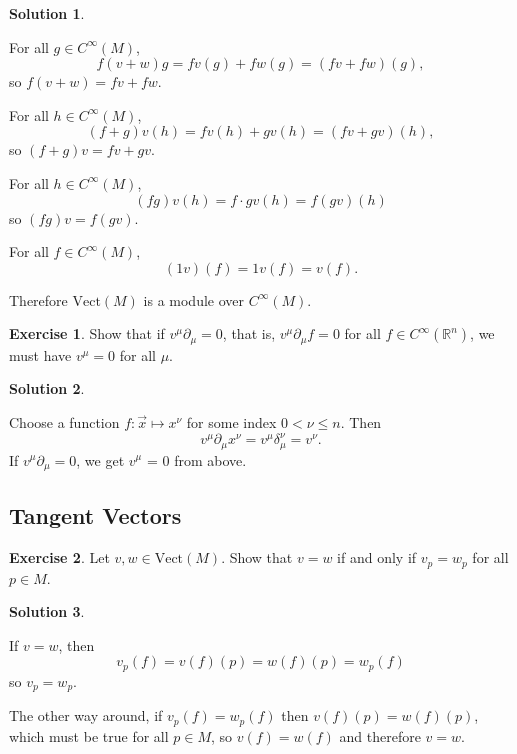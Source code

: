 \documentclass[11pt, a4paper]{article}
\theoremstyle{definition}
\newtheorem{ex}{Exercise}[part]
\newtheorem{sol}{Solution}[part]
\begin{document}
\begin{sol}\label{sol:module}

For all $g \in C^\infty(M)$,
\[
    f(v + w)g = fv(g) + fw(g) = (fv + fw)(g),
\]
so $f(v + w) = fv + fw$.

For all $h \in C^\infty(M)$,
\[
    (f + g)v(h) = fv(h) + gv(h) = (fv + gv)(h),
\]
so $(f + g)v = fv + gv$.


For all $h \in C^\infty(M)$,
\[
    (fg)v(h) = f \cdot gv(h) = f(gv)(h)
\]
so $(fg)v = f(gv)$.

For all $f \in C^\infty(M)$,
\[
    (1v)(f) = 1v(f) = v(f).
\]

Therefore $\text{Vect}(M)$ is a module over $C^\infty(M)$.

\end{sol}

\begin{ex}

Show that if $v^\mu\partial_\mu = 0$, that is, $v^\mu \partial_\mu f = 0$ for all $f \in C^\infty(\mathbb{R}^n)$, we must have $v^\mu = 0$ for all $\mu$.

\end{ex}

\begin{sol}\label{sol:basis}

Choose a function $f: \vec{x} \mapsto x^\nu$ for some index $0 < \nu \leq n$. Then
\[
    v^\mu \partial_\mu x^\nu = v^\mu \delta_\mu^\nu = v^\nu.
\]
If $v^\mu\partial_\mu = 0$, we get $v^\mu$ = 0 from above.

\end{sol}

\subsection{Tangent Vectors}

\begin{ex}

Let $v, w \in \text{Vect}(M)$. Show that $v = w$ if and only if $v_p = w_p$ for all $p \in M$.

\end{ex}

\begin{sol}\label{sol:tangentvectorpointequality}

If $v = w$, then
\[
    v_p(f) = v(f)(p) = w(f)(p) = w_p(f)
\]
so $v_p = w_p$.

The other way around, if $v_p(f) = w_p(f)$ then $v(f)(p) = w(f)(p)$, which must be true for all $p \in M$, so $v(f) = w(f)$ and therefore $v = w$.

\end{sol}
\end{document}
